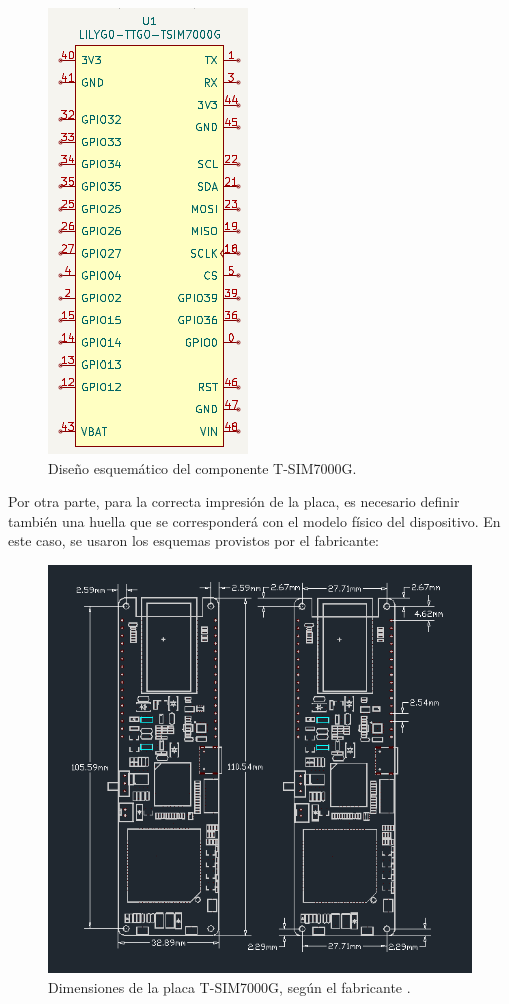 \begin{figure}[H]
  \centering
  \includegraphics[width=.3\linewidth]{images/TSIM7000G.png}
  \caption{Diseño esquemático del componente T-SIM7000G.}
  \label{fig:tsim-schematic}
\end{figure}

Por otra parte, para la correcta impresión de la placa, es necesario definir también
una huella que se corresponderá con el modelo físico del dispositivo. En este caso,
se usaron los esquemas provistos por el fabricante:

\begin{figure}[H]
  \centering
  \includegraphics[width=\linewidth]{images/dimensions.png}
  \caption{Dimensiones de la placa T-SIM7000G, según el fabricante \cite{4269LILYGO}.}
  \label{fig:dimensions}
\end{figure}

